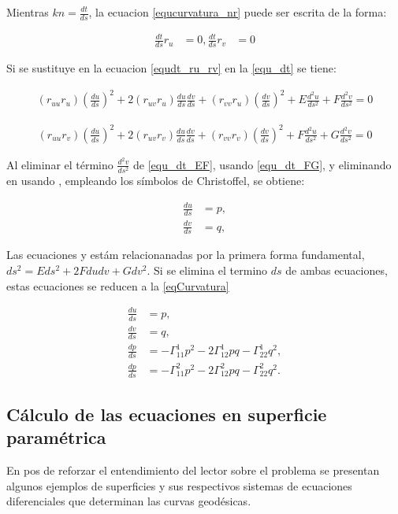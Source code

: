 \documentclass{endm}
\begin{document}
Mientras $kn = \frac{dt}{ds} $, la ecuacion 
\ref{equcurvatura_nr} 
puede ser escrita de la forma:

\begin{align} 
\frac{dt}{ds} r_u &=0,\frac{dt}{ds} r_v &=0
\label{equdt_ru_rv}
\end{align}

Si se sustituye en la ecuacion \ref{equdt_ru_rv} en la \ref{equ_dt} se tiene:

\begin{align} 
(r_{uu} r_u) (\frac{du}{ds})^2 + 2 (r_{uv} r_u) \frac{du}{ds} \frac{dv}{ds} + (r_{vv} r_u) (\frac{dv}{ds})^2 + E \frac{d^2u}{ds^2} + F \frac{d^2v}{ds^2} = 0
\label{equ_dt_EF}
\end{align}


\begin{align} 
(r_{uu} r_v) (\frac{du}{ds})^2 + 2 (r_{uv} r_v) \frac{du}{ds} \frac{dv}{ds} + (r_{vv} r_v) (\frac{dv}{ds})^2 + F \frac{d^2u}{ds^2} + G \frac{d^2v}{ds^2} = 0
\label{equ_dt_FG}
\end{align}

Al eliminar el t\'ermino $\frac{d^2v}{ds^2}$ de \ref{equ_dt_EF}, usando \ref{equ_dt_FG}, y eliminando en \label{equ_dt_FG} usando \label{equ_dt_EF}, empleando los s\'imbolos de Christoffel, se obtiene:

\begin{align} 
\frac{du}{ds}&=p, \label{equ1_Geo}\\
\frac{dv}{ds}&=q, \label{equ2_Geo}
\end{align}

Las ecuaciones \label{equ1_Geo} y \label{equ2_Geo} est\'am relacionanadas por la primera forma fundamental, $ds^2 = E ds^2+ 2 Fdudv+ G dv^2$. Si se elimina el termino $ds$ de ambas ecuaciones, estas ecuaciones se reducen a la \ref{eqCurvatura}


\begin{align} 
\frac{du}{ds}&=p, \label{eq1Geodesica}\\
\frac{dv}{ds}&=q, \label{eq2Geodesica}    \\
\frac{dp}{ds}&= - \Gamma_{11}^1 p^2 -2 \Gamma_{12}^1 pq - \Gamma_{22}^1 q^2, \label{eq3Geodesica}\\ 
\frac{dp}{ds}&=- \Gamma_{11}^2 p^2 -2 \Gamma_{12}^2 pq - \Gamma_{22}^2 q^2. \label{eq4Geodesica}
\end{align}

\subsection{C\'alculo de las ecuaciones en superficie param\'etrica}
En pos de reforzar el entendimiento del lector sobre el problema se presentan algunos ejemplos de superficies y sus respectivos sistemas de ecuaciones diferenciales que determinan las curvas geod\'esicas.
\end{document}

